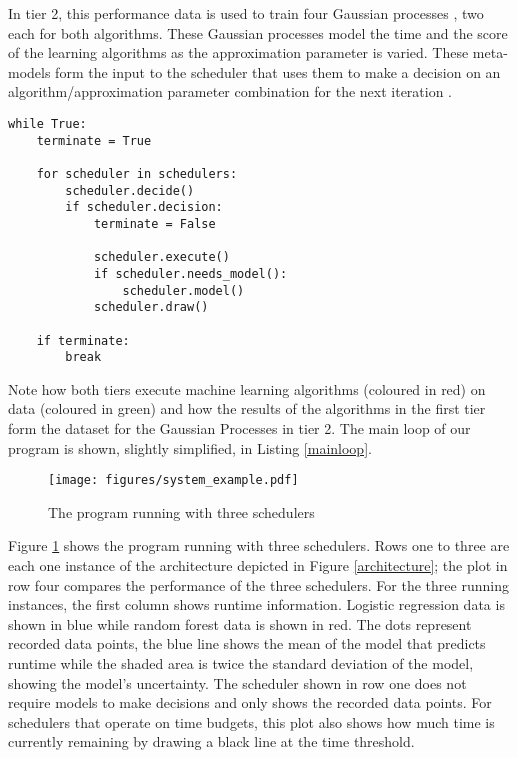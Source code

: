 \documentclass[a4paper,12pt,twoside,openright]{report}
\begin{document}
In tier 2, this performance data is used to train four Gaussian processes \raisebox{.5pt}{\textcircled{\raisebox{-.9pt} {4}}}, two each for both algorithms. These Gaussian processes model the time and the score of the learning algorithms as the approximation parameter is varied. These meta-models form the input to the scheduler \raisebox{.5pt}{\textcircled{\raisebox{-.9pt} {5}}} that uses them to make a decision on an algorithm/approximation parameter combination for the next iteration \raisebox{.5pt}{\textcircled{\raisebox{-.9pt} {6}}}.


\begin{lstlisting}[caption=The main loop of our scheduling program with slight edits for readability, label=mainloop]
while True:
    terminate = True

    for scheduler in schedulers:
        scheduler.decide()
        if scheduler.decision:
            terminate = False
            
            scheduler.execute()
            if scheduler.needs_model():
                scheduler.model() 
            scheduler.draw()

    if terminate:
        break
\end{lstlisting}


Note how both tiers execute machine learning algorithms (coloured in red) on data (coloured in green) and how the results of the algorithms in the first tier form the dataset for the Gaussian Processes in tier 2. The main loop of our program is shown, slightly simplified, in Listing \ref{mainloop}.

\begin{figure}[p]
    \centerline{\texttt{[image: figures/system\_example.pdf]}}
  \caption{The program running with three schedulers}
    \label{systemexample}
\end{figure}

Figure \ref{systemexample} shows the program running with three schedulers. Rows one to three are each one instance of the architecture depicted in Figure \ref{architecture}; the plot in row four compares the performance of the three schedulers. For the three running instances, the first column shows runtime information. Logistic regression data is shown in blue while random forest data is shown in red. The dots represent recorded data points, the blue line shows the mean of the model that predicts runtime while the shaded area is twice the standard deviation of the model, showing the model's uncertainty. The scheduler shown in row one does not require models to make decisions and only shows the recorded data points. For schedulers that operate on time budgets, this plot also shows how much time is currently remaining by drawing a black line at the time threshold.
\end{document}
